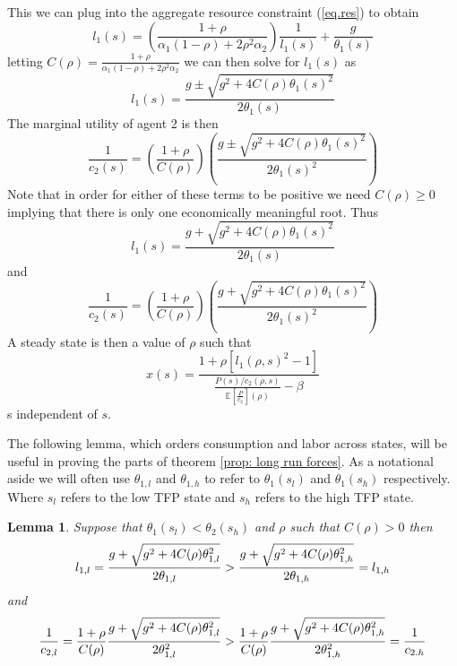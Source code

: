 \documentclass[thmsb,11pt]{article}
\newtheorem{lemma}{Lemma}
\begin{document}
This we can plug into the aggregate resource constraint (\ref{eq.res}) to
obtain
\begin{equation*}
l_1(s) = \left(\frac{1+\rho}{\alpha_1(1-\rho)+2\rho^2\alpha_2}\right)\frac{1}{l_1(s)} +
\frac{g}{\theta_1(s)}
\end{equation*}%
letting $C(\rho) = \frac{1+\rho}{\alpha_1(1-\rho)+2\rho^2\alpha_2}$ we can
then solve for $l_1(s)$ as
\begin{equation*}
l_1(s) = \frac{g\pm\sqrt{g^2+4C(\rho)\theta_1(s)^2}}{2\theta_1(s)}
\end{equation*}
The marginal utility of agent 2 is then
\begin{equation*}
\frac1{c_2(s)} = \left(\frac{1+\rho}{C(\rho)}\right)\left(\frac{g\pm\sqrt{g^2+4C(\rho)%
\theta_1(s)^2}}{2\theta_1(s)^2}\right)
\end{equation*}%
Note that in order for either of these terms to be positive we need $%
C(\rho)\geq 0$ implying that there is only one economically meaningful root.
Thus
\begin{equation}
l_1(s) = \frac{g+\sqrt{g^2+4C(\rho)\theta_1(s)^2}}{2\theta_1(s)}
\end{equation}
and
\begin{equation}
\frac1{c_2(s)} = \left(\frac{1+\rho}{C(\rho)}\right)\left(\frac{g+\sqrt{g^2+4C(\rho)%
\theta_1(s)^2}}{2\theta_1(s)^2} \right) \label{eq.uc2}
\end{equation}
A steady state is then a value of $\rho$ such that
\begin{equation}
x(s) = \frac{1+\rho[l_1(\rho,s)^2-1]}{\frac{P(s)/c_2(\rho,s)}{\mathbb{E}%
[\frac{P}{c_2}](\rho)}-\beta}  \label{eq.xSS}
\end{equation}%
s independent of $s$.

The following lemma, which orders consumption and labor across states, will
be useful in proving the parts of theorem \ref{prop: long run forces}.  As a notational aside we
will often use $\theta_{1,l}$ and $\theta_{1,h}$ to refer to $%
\theta_{1}(s_l) $ and $\theta_{1}(s_h)$ respectively. Where $s_l$ refers to
the low TFP state and $s_h$ refers to the high TFP state.

\begin{lemma}
Suppose that $\theta_1(s_l) < \theta_2(s_h)$ and $\rho$ such that $C(\rho) >
0$ then
\begin{equation*}
l_{1,l} = \frac{g+\sqrt{g^2+4C(\rho)\theta_{1,l}^2}}{2\theta_{1,l}} > \frac{%
g+\sqrt{g^2+4C(\rho)\theta_{1,h}^2}}{2\theta_{1,h}} = l_{1,h}
\end{equation*}
and
\begin{equation*}
\frac1{c_{2,l}} = \frac{1+\rho}{C(\rho)}\frac{g+\sqrt{g^2+4C(\rho)%
\theta_{1,l}^2}}{2\theta_{1,l}^2} > \frac{1+\rho}{C(\rho)}\frac{g+\sqrt{%
g^2+4C(\rho)\theta_{1,h}^2}}{2\theta_{1,h}^2} = \frac1{c_{2.h}}
\end{equation*}%
\label{lem.1}
\end{lemma}
\end{document}

